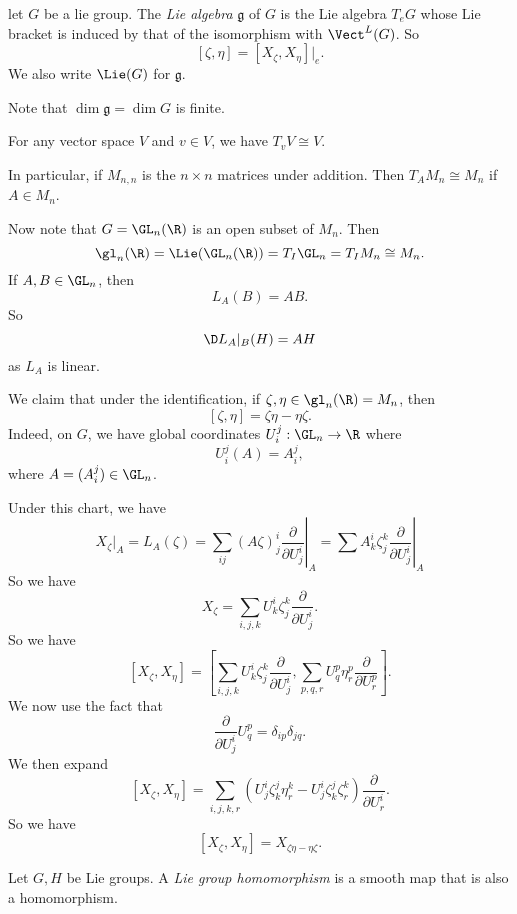 \documentclass[a4paper]{article}
\begin{document}
\begin{defi}
  let $G$ be a lie group. The \emph{Lie algebra} $\mathfrak{g}$ of $G$ is the Lie algebra $T_eG$ whose Lie bracket is induced by that of the isomorphism with $\Vect^L(G)$. So
  \[
    [\zeta, \eta] = [X_\zeta, X_\eta]|_e.
  \]
  We also write $\Lie(G)$ for $\mathfrak{g}$.
\end{defi}

Note that $\dim \mathfrak{g} = \dim G$ is finite.

\begin{eg}
  For any vector space $V$ and $v \in V$, we have $T_v V \cong V$.
\end{eg}

\begin{eg}
  In particular, if $M_{n, n}$ is the $n \times n$ matrices under addition. Then $T_A M_n \cong M_n$ if $A \in M_n$.

  Now note that $G = \GL_n(\R)$ is an open subset of $M_n$. Then
  \[
    \gl_n(\R) = \Lie(\GL_n(\R)) = T_I \GL_n = T_I M_n \cong M_n.
  \]
  If $A, B \in \GL_n$, then
  \[
    L_A(B) = AB.
  \]
  So
  \[
    \D L_A|_B(H) = AH
  \]
  as $L_A$ is linear.

  We claim that under the identification, if $\zeta, \eta \in \gl_n(\R) = M_n$, then
  \[
    [\zeta, \eta] = \zeta \eta - \eta \zeta.
  \]
  Indeed, on $G$, we have global coordinates $U_i^j: \GL_n \to \R$ where
  \[
    U_i^j(A) = A_i^j,
  \]
  where $A = (A_i^j) \in \GL_n$.

  Under this chart, we have
  \[
    X_\zeta|_A = L_A(\zeta) = \sum_{ij} (A \zeta)_j^i \left.\frac{\partial}{\partial U_j^i}\right|_A = \sum A_k^i \zeta_j^k \left.\frac{\partial}{\partial U_j^i} \right|_A
  \]
  So we have
  \[
    X_\zeta = \sum_{i,j,k} U^i_k \zeta^k_j \frac{\partial}{\partial U_j^i}.
  \]
  So we have
  \[
    [X_\zeta, X_\eta] = \left[\sum_{i,j,k} U_k^i \zeta_j^k \frac{\partial}{\partial U_j^i},\sum_{p, q, r} U_q^p \eta_r^p \frac{\partial}{\partial U_r^p}\right].
  \]
  We now use the fact that
  \[
    \frac{\partial}{\partial U^i_j} U^p_q = \delta_{ip}\delta_{jq}.
  \]
  We then expand
  \[
    [X_\zeta, X_\eta] = \sum_{i,j,k,r} (U_j^i \zeta_k^j \eta^k_r - U^i_j \zeta^j_k \zeta^k_r) \frac{\partial}{\partial U_r^i}.
  \]
  So we have
  \[
    [X_\zeta, X_\eta] = X_{\zeta\eta - \eta\zeta}.
  \]
\end{eg}

\begin{defi}
  Let $G, H$ be Lie groups. A \emph{Lie group homomorphism} is a smooth map that is also a homomorphism.
\end{defi}
\end{document}
